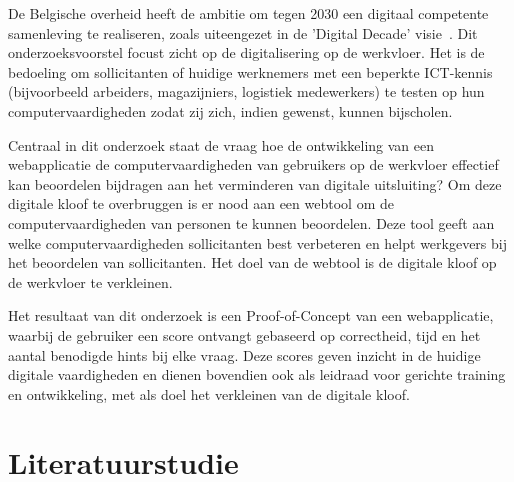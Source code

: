 De Belgische overheid heeft de ambitie om tegen 2030 een digitaal competente samenleving te realiseren, zoals uiteengezet in de 'Digital Decade' visie~\autocite{DigitalDecade2030}. Dit onderzoeksvoorstel focust zicht op de digitalisering op de werkvloer. Het is de bedoeling om sollicitanten of huidige werknemers met een beperkte ICT-kennis (bijvoorbeeld arbeiders, magazijniers, logistiek medewerkers) te testen op hun computervaardigheden zodat zij zich, indien gewenst, kunnen bijscholen. %

Centraal in dit onderzoek staat de vraag hoe de ontwikkeling van een webapplicatie de computervaardigheden van gebruikers op de werkvloer effectief kan beoordelen bijdragen aan het verminderen van digitale uitsluiting? Om deze digitale kloof te overbruggen is er nood aan een webtool om de computervaardigheden van personen te kunnen beoordelen. %
Deze tool geeft aan welke computervaardigheden sollicitanten best verbeteren en helpt werkgevers bij het beoordelen van sollicitanten. Het doel van de webtool is de digitale kloof op de werkvloer te verkleinen.

Het resultaat van dit onderzoek is een Proof-of-Concept van een webapplicatie, waarbij de gebruiker een score ontvangt gebaseerd op correctheid, tijd en het aantal benodigde hints bij elke vraag. Deze scores geven inzicht in de huidige digitale vaardigheden en dienen bovendien ook als leidraad voor gerichte training en ontwikkeling, met als doel het verkleinen van de digitale kloof.



\section{Literatuurstudie}%
\label{sec:state-of-the-art}


